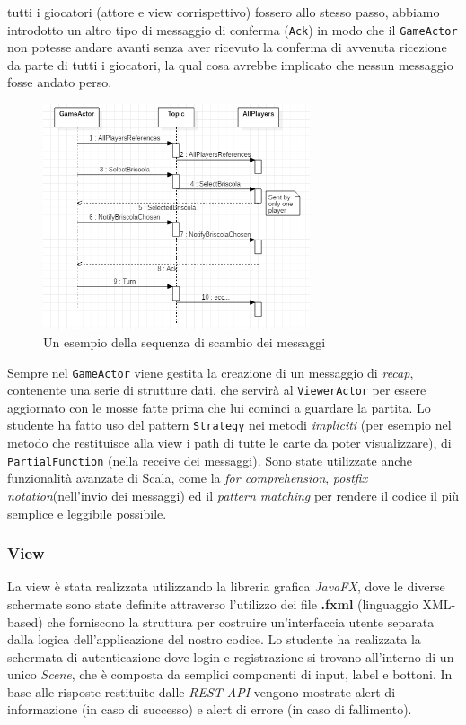 tutti i giocatori (attore e view corrispettivo) fossero allo stesso passo, abbiamo introdotto un altro tipo di messaggio di conferma (\texttt{Ack}) in modo che il \texttt{GameActor} non potesse andare avanti senza aver ricevuto la conferma di avvenuta ricezione da parte di tutti i giocatori, la qual cosa avrebbe implicato che nessun messaggio fosse andato perso.

\begin{figure}[h!]
 \centering
  \includegraphics[width=0.7\textwidth]{actorsMsgSeq.png}
   \caption{Un esempio della sequenza di scambio dei messaggi}
\end{figure}

Sempre nel \texttt{GameActor} viene gestita la creazione di un messaggio di \textit{recap}, contenente una serie di strutture dati, che servirà al \texttt{ViewerActor} per essere aggiornato con le mosse fatte prima che lui cominci a guardare la partita. Lo studente ha fatto uso del pattern \texttt{Strategy} nei metodi \textit{impliciti} (per esempio nel metodo che restituisce alla view i path di tutte le carte da poter visualizzare), di \texttt{PartialFunction} (nella receive dei messaggi). Sono state utilizzate anche funzionalità avanzate di Scala, come la \textit{for comprehension}, \textit{postfix notation}(nell'invio dei messaggi) ed il \textit{pattern matching} per rendere il codice il più semplice e leggibile possibile.

 \subsubsection{View}\label{subsub:jakova:view}
    La view è stata realizzata utilizzando la libreria grafica \textit{JavaFX}, dove le diverse schermate sono state definite attraverso l’utilizzo dei file \textbf{.fxml} (linguaggio XML-based) che forniscono la struttura per costruire un'interfaccia utente separata dalla logica dell'applicazione del nostro codice. Lo studente ha realizzata la schermata di autenticazione dove login e registrazione si trovano all’interno di un unico \textit{Scene}, che è composta da semplici componenti di input, label e bottoni. In base alle risposte restituite dalle \textit{REST API} vengono mostrate alert di informazione (in caso di successo) e alert di errore (in caso di fallimento).

